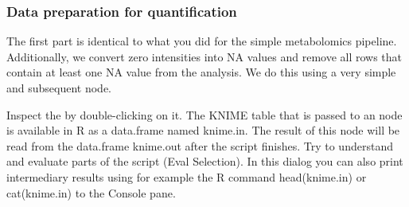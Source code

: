 \subsubsection{Data preparation for quantification}
The first part is identical to what you did for the simple metabolomics pipeline. Additionally, we convert zero intensities into NA values and remove all rows that contain at least one NA value from the analysis. We do this using a very simple  and subsequent  node.

\begin{task}
Inspect the  by double-clicking on it. The KNIME table that is passed to an  node is available in R as a data.frame named knime.in. The result of this node will be read from the data.frame knime.out after the script finishes. Try to understand and evaluate parts of the script (Eval Selection). In this dialog you can also print intermediary results using for example the R command head(knime.in) or cat(knime.in) to the Console pane.
\end{task}


